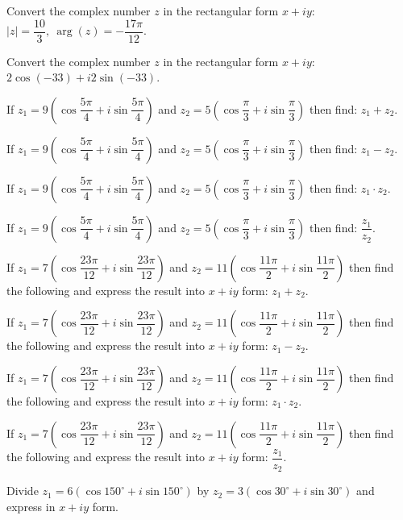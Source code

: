 \documentclass[11pt,a4paper]{article}
\begin{document}
\begin{shortlist}
\item Convert the complex number $z$ in the rectangular form $x+iy$: $|z|=\dfrac{10}{3},\ \arg(z)=-\dfrac{17\pi}{12}$.

\item Convert the complex number $z$ in the rectangular form $x+iy$: $2\cos(-33)+i2\sin(-33)$.

\item If $z_1=9\left(\cos\dfrac{5\pi}{4}+i\sin\dfrac{5\pi}{4}\right)$ and $z_2=5\left(\cos\dfrac{\pi}{3}+i\sin\dfrac{\pi}{3}\right)$ then find: $z_1+z_2$.

\item If $z_1=9\left(\cos\dfrac{5\pi}{4}+i\sin\dfrac{5\pi}{4}\right)$ and $z_2=5\left(\cos\dfrac{\pi}{3}+i\sin\dfrac{\pi}{3}\right)$ then find: $z_1-z_2$.

\item If $z_1=9\left(\cos\dfrac{5\pi}{4}+i\sin\dfrac{5\pi}{4}\right)$ and $z_2=5\left(\cos\dfrac{\pi}{3}+i\sin\dfrac{\pi}{3}\right)$ then find: $z_1\cdot z_2$.

\item If $z_1=9\left(\cos\dfrac{5\pi}{4}+i\sin\dfrac{5\pi}{4}\right)$ and $z_2=5\left(\cos\dfrac{\pi}{3}+i\sin\dfrac{\pi}{3}\right)$ then find: $\dfrac{z_1}{z_2}$.

\item If $z_1=7\left(\cos\dfrac{23\pi}{12}+i\sin\dfrac{23\pi}{12}\right)$ and $z_2=11\left(\cos\dfrac{11\pi}{2}+i\sin\dfrac{11\pi}{2}\right)$ then find the following and express the result into $x+iy$ form: $z_1+z_2$.

\item If $z_1=7\left(\cos\dfrac{23\pi}{12}+i\sin\dfrac{23\pi}{12}\right)$ and $z_2=11\left(\cos\dfrac{11\pi}{2}+i\sin\dfrac{11\pi}{2}\right)$ then find the following and express the result into $x+iy$ form: $z_1-z_2$.

\item If $z_1=7\left(\cos\dfrac{23\pi}{12}+i\sin\dfrac{23\pi}{12}\right)$ and $z_2=11\left(\cos\dfrac{11\pi}{2}+i\sin\dfrac{11\pi}{2}\right)$ then find the following and express the result into $x+iy$ form: $z_1\cdot z_2$.

\item If $z_1=7\left(\cos\dfrac{23\pi}{12}+i\sin\dfrac{23\pi}{12}\right)$ and $z_2=11\left(\cos\dfrac{11\pi}{2}+i\sin\dfrac{11\pi}{2}\right)$ then find the following and express the result into $x+iy$ form: $\dfrac{z_1}{z_2}$.

\item Divide $z_1=6(\cos 150^\circ+i\sin 150^\circ)$ by $z_2=3(\cos 30^\circ+i\sin 30^\circ)$ and express in $x+iy$ form.


\end{shortlist}
\end{document}
